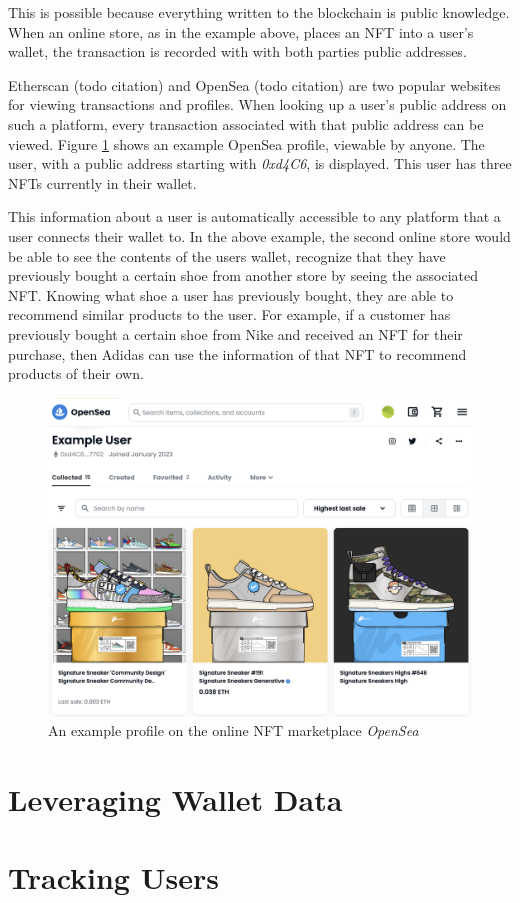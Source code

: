 This is possible because everything written to the blockchain is public knowledge. When an online store, as in the example above, places an NFT into a user's wallet, the transaction is recorded with with both parties public addresses.

Etherscan (todo citation) and OpenSea (todo citation) are two popular websites for viewing transactions and profiles. When looking up a user's public address on such a platform, every transaction associated with that public address can be viewed. Figure \ref{fig:openSea} shows an example OpenSea profile, viewable by anyone. The user, with a public address starting with \textit{0xd4C6}, is displayed. This user has three NFTs currently in their wallet.

This information about a user is automatically accessible to any platform that a user connects their wallet to. In the above example, the second online store would be able to see the contents of the users wallet, recognize that they have previously bought a certain shoe from another store by seeing the associated NFT. Knowing what shoe a user has previously bought, they are able to recommend similar products to the user. For example, if a customer has previously bought a certain shoe from Nike and received an NFT for their purchase, then Adidas can use the information of that NFT to recommend products of their own.

\begin{figure}[t]
\includegraphics[width=\textwidth]{./gfx/openSea.png}
\centering
\caption{An example profile on the online NFT marketplace \textit{OpenSea}}
\label{fig:openSea}
\end{figure}

%
%
\section{Leveraging Wallet Data}
\label{sec:methodology:leverage}

%
%
\section{Tracking Users}
\label{sec:methodology:tracking}


